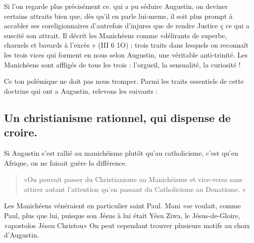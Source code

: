  
Si l'on regarde plus précisément ce. qui a	pu séduire Augustin, on deviner certains attraits bien que, dès qu'il en parle lui-meme, il soit plus prompt à accabler ses coreligionnaires d'autrefois  d'injures que de rendre Justice ç ce qui a suscité son attrait.
Il décrit les Manichéens comme «délirants de superbe, charnels et bavards à l'excès » (III 6 1O) : trois traits dans lesquels on reconnaît	les trois
vices qui forment en nous selon Augustin, une véritable anti-trinité. Les Manichéens sont affligés de tous les trois : l'orgueil, la sensualité, la curiosité ! 
 
Ce ton polémique ne doit pas nous tromper. Parmi les traits essentiels de cette doctrine qui ont a Augustin, relevons les suivants :

\subsection{Un  christianisme  rationnel,  qui  dispense  de croire.}

Si Augustin s'est rallié au manichéisme plutôt qu'au catholicisme, c'est qu'en Afrique, on ne faisait guère la différence.
\begin{quote}
    «On pouvait passer du Christianisme au Manichéisme et vice-versa sans attirer autant l'attention qu'en passant du Catholicisme au Donatisme. »
\end{quote} 

Les Manichéens vénéraient en particulier saint Paul. Mani «se voulait, comme Paul, plus que lui, puisque son Jésus à lui était Yésu Ziwa, le Jésus-de-Gloire, «apostolos Jésou Christou»   On peut cependant trouver plusieurs motifs au choix d'Augustin.

